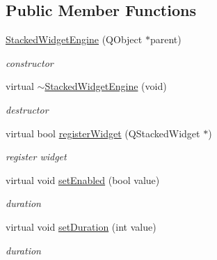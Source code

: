 \subsection*{Public Member Functions}
\begin{DoxyCompactItemize}
\item 
\mbox{\label{class_stacked_widget_engine_a7fb01805f1a470372951974a86cd0cf8}} 
\hyperlink{class_stacked_widget_engine_a7fb01805f1a470372951974a86cd0cf8}{Stacked\+Widget\+Engine} (Q\+Object $\ast$parent)
\begin{DoxyCompactList}\small\item\em constructor \end{DoxyCompactList}\item 
\mbox{\label{class_stacked_widget_engine_a945383d05b712dc4229a83fac0d3a299}} 
virtual \hyperlink{class_stacked_widget_engine_a945383d05b712dc4229a83fac0d3a299}{$\sim$\+Stacked\+Widget\+Engine} (void)
\begin{DoxyCompactList}\small\item\em destructor \end{DoxyCompactList}\item 
\mbox{\label{class_stacked_widget_engine_ad236003bed536451776a5ab5bebd48dd}} 
virtual bool \hyperlink{class_stacked_widget_engine_ad236003bed536451776a5ab5bebd48dd}{register\+Widget} (Q\+Stacked\+Widget $\ast$)
\begin{DoxyCompactList}\small\item\em register widget \end{DoxyCompactList}\item 
\mbox{\label{class_stacked_widget_engine_a1494dc8b97c7a5a3630bf2475407c802}} 
virtual void \hyperlink{class_stacked_widget_engine_a1494dc8b97c7a5a3630bf2475407c802}{set\+Enabled} (bool value)
\begin{DoxyCompactList}\small\item\em duration \end{DoxyCompactList}\item 
\mbox{\label{class_stacked_widget_engine_a498a3d2ababe07f3f753957cab47cd2c}} 
virtual void \hyperlink{class_stacked_widget_engine_a498a3d2ababe07f3f753957cab47cd2c}{set\+Duration} (int value)
\begin{DoxyCompactList}\small\item\em duration \end{DoxyCompactList}\end{DoxyCompactItemize}
